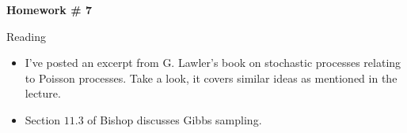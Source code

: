 \documentclass{article}
\begin{document}
\renewcommand{\a}{\textbf{a}}
\renewcommand{\b}{\textbf{b}}
\renewcommand{\d}{\textbf{d}}
\newcommand{\e}{\textbf{e}}

\large

\begin{center}
\textbf{Homework \# 7} \\  
\end{center}



\medskip


\newcommand{\normal}{\mathcal{N}}

Reading
\begin{itemize}
\item I've posted an excerpt from G. Lawler's book on stochastic processes relating to Poisson processes.   Take a look, it covers similar ideas as mentioned in the lecture.
\item Section $11.3$ of Bishop discusses Gibbs sampling.
\end{itemize}
\end{document}
